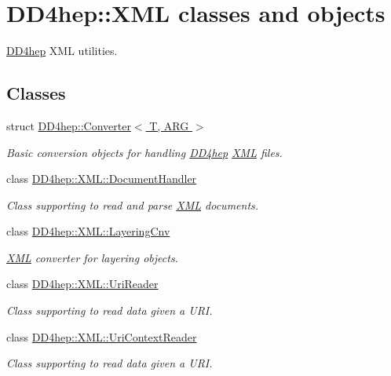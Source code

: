 \hypertarget{group___d_d4_h_e_p___x_m_l}{}\section{D\+D4hep\+:\+:X\+ML classes and objects}
\label{group___d_d4_h_e_p___x_m_l}


\hyperlink{namespace_d_d4hep}{D\+D4hep} X\+ML utilities.  


\subsection*{Classes}
\begin{DoxyCompactItemize}
\item 
struct \hyperlink{struct_d_d4hep_1_1_converter}{D\+D4hep\+::\+Converter$<$ T, A\+R\+G $>$}
\begin{DoxyCompactList}\small\item\em Basic conversion objects for handling \hyperlink{namespace_d_d4hep}{D\+D4hep} \hyperlink{namespace_d_d4hep_1_1_x_m_l}{X\+ML} files. \end{DoxyCompactList}\item 
class \hyperlink{class_d_d4hep_1_1_x_m_l_1_1_document_handler}{D\+D4hep\+::\+X\+M\+L\+::\+Document\+Handler}
\begin{DoxyCompactList}\small\item\em Class supporting to read and parse \hyperlink{namespace_d_d4hep_1_1_x_m_l}{X\+ML} documents. \end{DoxyCompactList}\item 
class \hyperlink{class_d_d4hep_1_1_x_m_l_1_1_layering_cnv}{D\+D4hep\+::\+X\+M\+L\+::\+Layering\+Cnv}
\begin{DoxyCompactList}\small\item\em \hyperlink{namespace_d_d4hep_1_1_x_m_l}{X\+ML} converter for layering objects. \end{DoxyCompactList}\item 
class \hyperlink{class_d_d4hep_1_1_x_m_l_1_1_uri_reader}{D\+D4hep\+::\+X\+M\+L\+::\+Uri\+Reader}
\begin{DoxyCompactList}\small\item\em Class supporting to read data given a U\+RI. \end{DoxyCompactList}\item 
class \hyperlink{class_d_d4hep_1_1_x_m_l_1_1_uri_context_reader}{D\+D4hep\+::\+X\+M\+L\+::\+Uri\+Context\+Reader}
\begin{DoxyCompactList}\small\item\em Class supporting to read data given a U\+RI. \end{DoxyCompactList}\item 

\end{DoxyCompactItemize}
